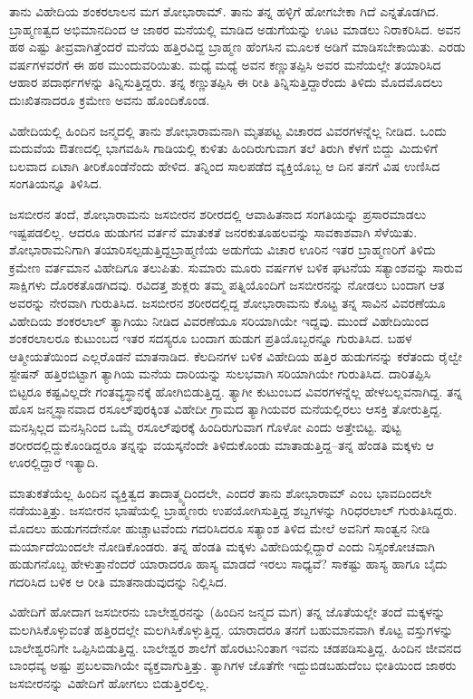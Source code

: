 ತಾನು ವಿಹೇದಿಯ ಶಂಕರಲಾಲನ ಮಗ ಶೋಭಾರಾಮ್. ತಾನು ತನ್ನ ಹಳ್ಳಿಗೆ ಹೋಗಬೇಕಾ ಗಿದೆ ಎನ್ನತೊಡಗಿದ. ಬ್ರಾಹ್ಮಣತ್ವದ ಅಭಿಮಾನದಿಂದ ಆ ಜಾಠರ ಮನೆಯಲ್ಲಿ ಮಾಡಿದ ಅಡುಗೆಯನ್ನು ಊಟ ಮಾಡಲು ನಿರಾಕರಿಸಿದ. ಅವನ ಹಠ ಎಷ್ಟು ತೀವ್ರವಾಗಿತ್ತೆಂದರೆ ಮನೆಯ ಹತ್ತಿರವಿದ್ದ ಬ್ರಾಹ್ಮಣ ಹೆಂಗಸಿನ ಮೂಲಕ ಅಡಿಗೆ ಮಾಡಿಸಬೇಕಾಯಿತು. ಎರಡು ವರ್ಷಗಳವರೆಗೆ ಈ ಹಠ ಮುಂದುವರಿಯಿತು. ಮಧ್ಯೆ ಮಧ್ಯೆ ಅವನ ಕಣ್ಣುತಪ್ಪಿಸಿ ಅವರ ಮನೆಯಲ್ಲೇ ತಯಾರಿಸಿದ ಆಹಾರ ಪದಾರ್ಥಗಳನ್ನು ತಿನ್ನಿಸುತ್ತಿದ್ದರು. ತನ್ನ ಕಣ್ಣುತಪ್ಪಿಸಿ ಈ ರೀತಿ ತಿನ್ನಿಸುತ್ತಿದ್ದಾರೆಂದು ತಿಳಿದು ಮೊದಮೊದಲು ದುಃಖಿತನಾದರೂ ಕ್ರಮೇಣ ಅವನು ಹೊಂದಿಕೊಂಡ.

ವಿಹೇದಿಯಲ್ಲಿ ಹಿಂದಿನ ಜನ್ಮದಲ್ಲಿ ತಾನು ಶೋಭಾರಾಮನಾಗಿ ಮೃತಪಟ್ಟ ವಿಚಾರದ ವಿವರಗಳನ್ನೆಲ್ಲ ನೀಡಿದ. ಒಂದು ಮದುವೆಯ ಔತಣದಲ್ಲಿ ಭಾಗವಹಿಸಿ ಗಾಡಿಯಲ್ಲಿ ಕುಳಿತು ಹಿಂದಿರುಗುವಾಗ ತಲೆ ತಿರುಗಿ ಕೆಳಗೆ ಬಿದ್ದು ಮಿದುಳಿಗೆ ಬಲವಾದ ಏಟಾಗಿ ತೀರಿಕೊಂಡೆನೆಂದು ಹೇಳಿದ. ತನ್ನಿಂದ ಸಾಲಪಡೆದ ವ್ಯಕ್ತಿಯೊಬ್ಬ ಆ ದಿನ ತನಗೆ ವಿಷ ಉಣಿಸಿದ ಸಂಗತಿಯನ್ನೂ ತಿಳಿಸಿದ.

ಜಸಬೀರನ ತಂದೆ, ಶೋಭಾರಾಮನು ಜಸಬೀರನ ಶರೀರದಲ್ಲಿ ಆವಾಹಿತನಾದ ಸಂಗತಿಯನ್ನು ಪ್ರಸಾರಮಾಡಲು ಇಷ್ಟಪಡಲಿಲ್ಲ. ಆದರೂ ಹುಡುಗನ ವರ್ತನೆ ಮಾತುಕತೆ ಜನರ\break ಕುತೂಹಲವನ್ನು ಸಾವಕಾಶವಾಗಿ ಸೆಳೆಯಿತು. ಶೋಭಾರಾಮನಿಗಾಗಿ ತಯಾರಿಸಲ್ಪಡುತ್ತಿದ್ದ\break ಬ್ರಾಹ್ಮಣಿಯ ಅಡುಗೆಯ ವಿಚಾರ ಊರಿನ ಇತರ ಬ್ರಾಹ್ಮಣರಿಗೆ ತಿಳಿದು ಕ್ರಮೇಣ ವರ್ತಮಾನ ವಿಹೇದಿಗೂ ತಲುಪಿತು. ಸುಮಾರು ಮೂರು ವರ್ಷಗಳ ಬಳಿಕ ಘಟನೆಯ ಸತ್ಯಾಂಶವನ್ನು ಸಾರುವ ಸಾಕ್ಷಿಗಳು ದೊರಕತೊಡಗಿದವು. ರವಿದತ್ತ ಶುಕ್ಲರು ತಮ್ಮ ಪತ್ನಿಯೊಂದಿಗೆ ಜಸಬೀರನನ್ನು ನೋಡಲು ಬಂದಾಗ ಆತ ಅವರನ್ನು ನೇರವಾಗಿ ಗುರುತಿಸಿದ. ಜಸಬೀರನ ಶರೀರದಲ್ಲಿದ್ದ ಶೋಭಾರಾಮನು ಕೊಟ್ಟ ತನ್ನ ಸಾವಿನ ವಿವರಣೆಯೂ ವಿಹೇದಿಯ ಶಂಕರಲಾಲ್ ತ್ಯಾಗಿಯು ನೀಡಿದ ವಿವರಣೆಯೂ ಸರಿಯಾಗಿಯೇ ಇದ್ದವು. ಮುಂದೆ ವಿಹೇದಿಯಿಂದ ಶಂಕರಲಾಲರೂ ಕುಟುಂಬದ ಇತರ ಸದಸ್ಯರೂ ಬಂದಾಗ ಹುಡುಗ ಪ್ರತಿಯೊಬ್ಬರನ್ನೂ ಗುರುತಿಸಿದ. ಬಹಳ ಆತ್ಮೀಯತೆಯಿಂದ ಎಲ್ಲರೊಡನೆ ಮಾತನಾಡಿದ. ಕೆಲದಿನಗಳ ಬಳಿಕ ವಿಹೇದಿಯ ಹತ್ತಿರ ಹುಡುಗನನ್ನು ಕರೆತಂದು ರೈಲ್ವೇ ಸ್ಟೇಷನ್ ಹತ್ತಿರಬಿಟ್ಟಾಗ ತ್ಯಾಗಿಯ ಮನೆಯ ದಾರಿಯನ್ನು ಸುಲಭವಾಗಿ ಸರಿಯಾಗಿಯೇ ಗುರುತಿಸಿದ. ದಾರಿತಪ್ಪಿಸಿ ಬಿಟ್ಟರೂ ಕಷ್ಟವಿಲ್ಲದೇ ಗಂತವ್ಯಸ್ಥಾನಕ್ಕೆ ಹೋಗಿ\-ಬಿಡು\-ತ್ತಿದ್ದ. ತ್ಯಾಗೀ ಕುಟುಂಬದ ವಿವರಗಳನ್ನೆಲ್ಲ ಹೇಳಬಲ್ಲವನಾಗಿದ್ದ. ತನ್ನ ಹೊಸ ಜನ್ಮಸ್ಥಾನವಾದ ರಸೂಲ್​ಪುರಕ್ಕಿಂತ ವಿಹೇದೀ ಗ್ರಾಮದ ತ್ಯಾಗಿಯವರ ಮನೆಯಲ್ಲಿರಲು ಆಸಕ್ತಿ ತೋರುತ್ತಿದ್ದ. ಮನಸ್ಸಿಲ್ಲದ ಮನಸ್ಸಿನಿಂದ ಒಮ್ಮೆ ರಸೂಲ್​ಪುರಕ್ಕೆ ಹಿಂದಿರುಗುವಾಗ ಗೊಳೋ ಎಂದು ಅತ್ತೇಬಿಟ್ಟ. ಪುಟ್ಟ ಶರೀರದಲ್ಲಿದ್ದುಕೊಂಡಿದ್ದರೂ ತನ್ನನ್ನು ವಯಸ್ಕನೆಂದೇ ತಿಳಿದುಕೊಂಡು ಮಾತಾಡುತ್ತಿದ್ದ–ತನ್ನ ಹೆಂಡತಿ ಮಕ್ಕಳು ಆ ಊರಲ್ಲಿದ್ದಾರೆ ಇತ್ಯಾದಿ.

ಮಾತುಕತೆಯೆಲ್ಲ ಹಿಂದಿನ ವ್ಯಕ್ತಿತ್ವದ ತಾದಾತ್ಮ್ಯದಿಂದಲೇ, ಎಂದರೆ ತಾನು ಶೋಭಾರಾಮ್ ಎಂಬ ಭಾವದಿಂದಲೇ ನಡೆಯುತ್ತಿತ್ತು. ಜಸಬೀರನ ಭಾಷೆಯಲ್ಲಿ ಬ್ರಾಹ್ಮಣರು ಉಪಯೋಗಿಸುತ್ತಿದ್ದ ಶಬ್ದಗಳನ್ನು ಗಿರಿಧರಲಾಲ್ ಗುರುತಿಸಿದ್ದರು. ಮೊದಲು ಹುಡುಗನದೇನೋ ಹುಚ್ಚಾಟವೆಂದು ಗದರಿಸಿದರೂ ಸತ್ಯಾಂಶ ತಿಳಿದ ಮೇಲೆ ಅವನಿಗೆ ಸಾಂತ್ವನ ನೀಡಿ ಮರ್ಯಾದೆಯಿಂದಲೇ ನೋಡಿ\-ಕೊಂಡರು. ತನ್ನ ಹೆಂಡತಿ ಮಕ್ಕಳು ವಿಹೇದಿಯಲ್ಲಿದ್ದಾರೆ ಎಂದು ನಿಸ್ಸಂಕೋಚವಾಗಿ ಹುಡುಗನೊಬ್ಬ ಹೇಳುತ್ತಾನೆಂದರೆ ಯಾರಾದರೂ ಹಾಸ್ಯ ಮಾಡದೆ ಇರಲು ಸಾಧ್ಯವೆ? ಸಾಕಷ್ಟು ಹಾಸ್ಯ ಹಾಗೂ ಬೈದು ಗದರಿಸಿದ ಬಳಿಕ ಆ ರೀತಿ ಮಾತನಾಡುವುದನ್ನು ನಿಲ್ಲಿಸಿದ.

ವಿಹೇದಿಗೆ ಹೋದಾಗ ಜಸಬೀರನು ಬಾಲೇಶ್ವರನನ್ನು (ಹಿಂದಿನ ಜನ್ಮದ ಮಗ) ತನ್ನ ಜೊತೆ\-ಯಲ್ಲೇ ತಂದೆ ಮಕ್ಕಳನ್ನು ಮಲಗಿಸಿಕೊಳ್ಳುವಂತೆ ಹತ್ತಿರದಲ್ಲೇ ಮಲಗಿಸಿಕೊಳ್ಳುತ್ತಿದ್ದ. ಯಾರಾದರೂ ತನಗೆ ಬಹುಮಾನವಾಗಿ ಕೊಟ್ಟ ವಸ್ತುಗಳನ್ನು ಬಾಲೇಶ್ವರನಿಗೇ ಒಪ್ಪಿಸಿಬಿಡುತ್ತಿದ್ದ. ಬಾಲೇಶ್ವರ ಶಾಲೆಗೆ ಹೊರಟುನಿಂತಾಗ ಇವನು ಚಡಪಡಿಸುತ್ತಿದ್ದ. ಹಿಂದಿನ ಜೀವನದ ಬಾಂಧವ್ಯ ಅಷ್ಟು ಪ್ರಬಲವಾಗಿಯೇ ವ್ಯಕ್ತವಾಗುತ್ತಿತ್ತು. ತ್ಯಾಗಿಗಳ ಜೊತೆಗೇ ಇದ್ದುಬಿಡಬಹುದೆಂಬ ಭೀತಿಯಿಂದ ಜಾಠರು ಜಸಬೀರನನ್ನು ವಿಹೇದಿಗೆ ಹೋಗಲು ಬಿಡುತ್ತಿರಲಿಲ್ಲ.

